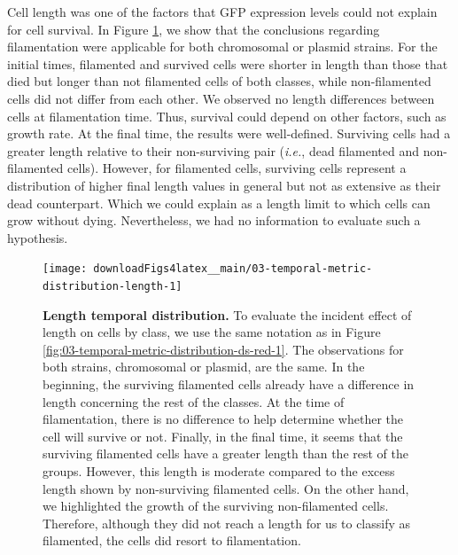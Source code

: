 \documentclass[a4paper, nobind]{templates/ociamthesis}
\begin{document}
Cell length was one of the factors that GFP expression levels could not explain for cell survival.
In Figure \ref{fig:03-temporal-metric-distribution-length-1}, we show that the conclusions regarding filamentation were applicable for both chromosomal or plasmid strains.
For the initial times, filamented and survived cells were shorter in length than those that died but longer than not filamented cells of both classes, while non-filamented cells did not differ from each other.
We observed no length differences between cells at filamentation time.
Thus, survival could depend on other factors, such as growth rate.
At the final time, the results were well-defined.
Surviving cells had a greater length relative to their non-surviving pair (\emph{i.e.}, dead filamented and non-filamented cells).
However, for filamented cells, surviving cells represent a distribution of higher final length values in general but not as extensive as their dead counterpart.
Which we could explain as a length limit to which cells can grow without dying.
Nevertheless, we had no information to evaluate such a hypothesis.





\begin{figure}[H]
\texttt{[image: downloadFigs4latex\_\_main/03-temporal-metric-distribution-length-1]} \caption[Length temporal distribution.]{\textbf{Length temporal distribution.} To evaluate the incident effect of length on cells by class, we use the same notation as in Figure \ref{fig:03-temporal-metric-distribution-ds-red-1}. The observations for both strains, chromosomal or plasmid, are the same. In the beginning, the surviving filamented cells already have a difference in length concerning the rest of the classes. At the time of filamentation, there is no difference to help determine whether the cell will survive or not. Finally, in the final time, it seems that the surviving filamented cells have a greater length than the rest of the groups. However, this length is moderate compared to the excess length shown by non-surviving filamented cells. On the other hand, we highlighted the growth of the surviving non-filamented cells. Therefore, although they did not reach a length for us to classify as filamented, the cells did resort to filamentation.}\label{fig:03-temporal-metric-distribution-length-1}
\end{figure}
\end{document}
